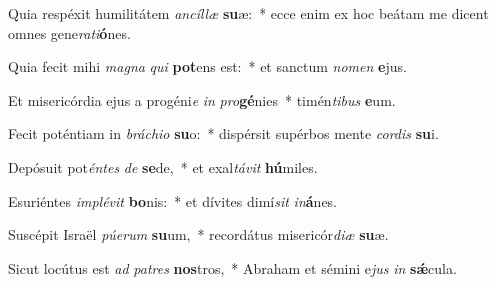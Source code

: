\item Quia respéxit humilitátem \textit{an}\textit{cíl}\textit{læ} \textbf{su}æ:~* ecce enim ex hoc beátam me dicent omnes gene\textit{ra}\textit{ti}\textbf{ó}nes.
\item Quia fecit mihi \textit{ma}\textit{gna} \textit{qui} \textbf{pot}ens est:~* et sanctum \textit{no}\textit{men} \textbf{e}jus.
\item Et misericórdia ejus a progéni\textit{e} \textit{in} \textit{pro}\textbf{gé}nies~* timén\textit{ti}\textit{bus} \textbf{e}um.
\item Fecit poténtiam in \textit{brá}\textit{chi}\textit{o} \textbf{su}o:~* dispérsit supérbos mente \textit{cor}\textit{dis} \textbf{su}i.
\item Depósuit pot\textit{én}\textit{tes} \textit{de} \textbf{se}de,~* et exal\textit{tá}\textit{vit} \textbf{hú}miles.
\item Esuriéntes \textit{im}\textit{plé}\textit{vit} \textbf{bo}nis:~* et dívites dimí\textit{sit} \textit{in}\textbf{á}nes.
\item Suscépit Israël \textit{pú}\textit{e}\textit{rum} \textbf{su}um,~* recordátus misericór\textit{di}\textit{æ} \textbf{su}æ.
\item Sicut locútus est \textit{ad} \textit{pa}\textit{tres} \textbf{nos}tros,~* Abraham et sémini e\textit{jus} \textit{in} \textbf{sǽ}cula.
